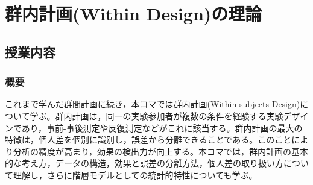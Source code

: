 \section{群内計画(Within Design)の理論}
\label{b20_WithinDesign}

\subsection{授業内容}
\subsubsection{概要}
これまで学んだ群間計画に続き，本コマでは群内計画(Within-subjects Design)について学ぶ。群内計画は，同一の実験参加者が複数の条件を経験する実験デザインであり，事前-事後測定や反復測定などがこれに該当する。群内計画の最大の特徴は，個人差を個別に識別し，誤差から分離できることである。このことにより分析の精度が高まり，効果の検出力が向上する。本コマでは，群内計画の基本的な考え方，データの構造，効果と誤差の分離方法，個人差の取り扱い方について理解し，さらに階層モデルとしての統計的特性についても学ぶ。

